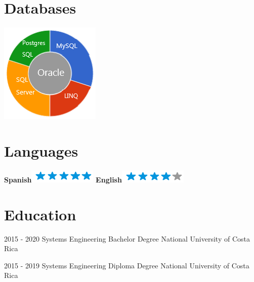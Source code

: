 \documentclass[]{friggeri-cv}
\begin{document}
\begin{aside}
  \section{Databases}
    \includegraphics[scale=0.62]{img/DB.png}
    ~
   \section{Languages}
    \textbf{Spanish}\includegraphics[scale=0.40]{img/5stars.png}
    \textbf{English}\includegraphics[scale=0.40]{img/4stars.png}
\end{aside}

\section{Education}
\begin{entrylist}
  \entry
    {2015 - 2020}
    {Systems Engineering Bachelor Degree}
    {National University of Costa Rica}
    
  \entry
    {2015 - 2019}
    {Systems Engineering Diploma Degree}
    {National University of Costa Rica}
    
\end{entrylist}
\end{document}

